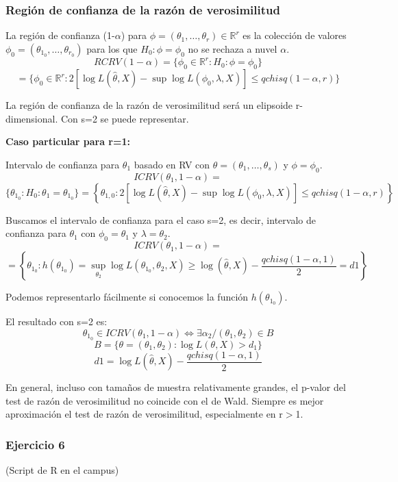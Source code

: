 \subsubsection{Región de confianza de la razón de verosimilitud}

La región de confianza (1-$\alpha$) para $\phi=(\theta_1,\dots,\theta_r)\in \mathbb{R}^r$ es la colección de valores
$\phi_0=(\theta_{1_0},\dots,\theta_{r_0})$ para los que $H_0:\phi=\phi_0$ no se rechaza a nuvel $\alpha$.
\[
RCRV(1-\alpha)=\{\phi_0 \in \mathbb{R}^r:H_0:\phi=\phi_0\}
\]\[
    =\{\phi_0 \in \mathbb{R}^r:2[\log L(\widehat{\theta},X)-\sup \log L(\phi_0,\lambda,X)] \leq qchisq(1-\alpha,r)\}
\]

La región de confianza de la razón de verosimilitud será un elipsoide r-dimensional. Con s=2 se puede representar.

\textbf{Caso particular para r=1:}

Intervalo de confianza para $\theta_1$ basado en RV con $\theta=(\theta_1,\dots,\theta_s)$ y $\phi=\phi_0$.
\[
ICRV(\theta_1,1-\alpha)=
\]\[\{\theta_{1_0}:H_0:\theta_1=\theta_{1_0}\}
= \left\{ \theta_{1,0} : 2\left[\log L(\widehat{\theta},X) - \sup \log L(\phi_0, \lambda, X)\right] \leq qchisq(1 - \alpha, r) \right\}
\]

Buscamos el intervalo de confianza para el caso s=2, es decir, intervalo de confianza para $\theta_1$ con $\phi_0=\theta_1$ y $\lambda=\theta_2$.
\[
ICRV(\theta_1,1-\alpha)=
\]\[
=\left\{ 
\theta_{1_0}:h(\theta_{1_0})=\sup_{\theta_2} \log L(\theta_{1_0},\theta_2,X) \geq \log(\widehat{\theta},X)-\frac{qchisq(1-\alpha,1)}{2}=d1
\right\}
\]

Podemos representarlo fácilmente si conocemos la función $h(\theta_{1_0})$.

El resultado con s=2 es:
\[
\theta_{1_0} \in  ICRV(\theta_1,1-\alpha) \Longleftrightarrow \exists \alpha_2 / (\theta_1,\theta_2) \in B
\]
\[
B=\{\theta=(\theta_1,\theta_2):\log L(\theta,X)>d_1\}
\]
\[
d1=\log L(\widehat{\theta},X)-\frac{qchisq(1-\alpha,1)}{2}
\]

En general, incluso con tamaños de muestra relativamente grandes, el p-valor del test de razón de verosimilitud no coincide con el de Wald.
Siempre es mejor aproximación el test de razón de verosimilitud, especialmente en r$>$1.
\newpage
\subsubsection*{Ejercicio 6}
(Script de R en el campus)

